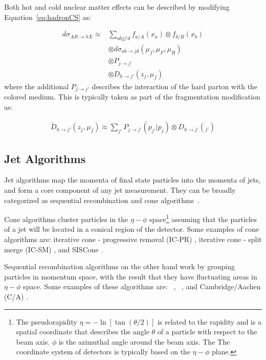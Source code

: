 Both hot and cold nuclear matter effects can be described by modifying Equation~\ref{eq:hadronCS} as:

\begin{align}
d \sigma_{AB \rightarrow hX}  \approx & \sum_{abjj'd} f_{a/A} (x_a) \otimes f_{b/B} (x_b) \\ 
& \otimes d\sigma_{ab\rightarrow jd} (\mu_f, \mu_F, \mu_R)  \nonumber \\
& \otimes P_{j\rightarrow j'} \nonumber \\
& \otimes D_{h \rightarrow j'} (z_j, \mu_f) \nonumber 
\end{align}
where the additional $P_{j\rightarrow j'}$ describes the interaction of the hard parton with the colored medium.
This is typically taken as part of the fragmentation modification as:

\begin{align}
\widetilde{D}_{h \rightarrow j'} (z_j, \mu_f) \approx \sum_{j'} P_{j\rightarrow j'} (p_{j'} | p_j) \otimes D_{h\rightarrow j'} (_{j'})
\end{align}




\subsection{Jet Algorithms}
\label{sec:jet_algo}
Jet algorithms map the momenta of final state particles into the momenta of jets, and form a core component of any jet measurement.
They can be broadly categorized as sequential recombination and cone algorithms~\cite{Atkin_2015}. 

Cone algorithms cluster particles in the $\eta-\phi$ space\footnote{The pseudorapidity $\eta = -\ln [\tan(\theta/2)]$ is related to the rapidity and is a spatial coordinate that describes the angle $\theta$ of a particle with respect to the beam axis. $\phi$ is the azimuthal angle around the beam axis. The The coordinate system of detectors is typically based on the $\eta-\phi$ plane.} assuming that the particles of a jet will be located in a conical region of the detector.
Some examples of cone algorithms are: iterative cone - progressive removal (IC-PR) \cite{ARNISON1983214}, iterative cone - split merge (IC-SM) \cite{Blazey:2000qt}, and SISCone \cite{Salam_2007}.

Sequential recombination algorithms on the other hand work by grouping particles in momentum space, with the result that they have fluctuating areas in $\eta-\phi$ space.
Some examples of these algorithms are: \kt\ \cite{Catani:1993hr}, \antikt\ \cite{Cacciari:2008gp}, and Cambridge/Aachen (C/A) \cite{Dokshitzer:1997in}.

